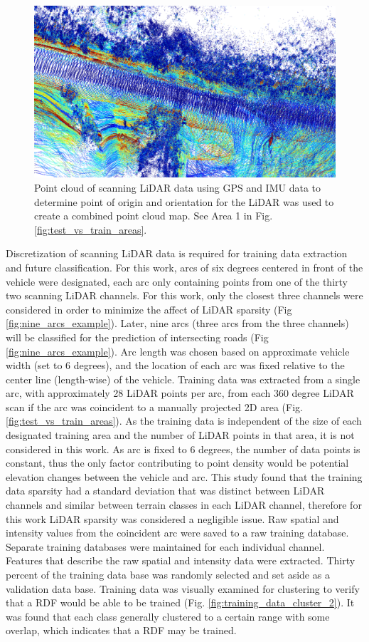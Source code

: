 \documentclass[journal,onecolumn]{IEEEtran}
\begin{document}
			\begin{figure}[H]
				\centering
				\includegraphics[width=0.75\linewidth]{figures/combined_pcd_example}
				\caption[Aggregated Point Cloud Data]{Point cloud of scanning LiDAR data using GPS and IMU data to determine point of origin and orientation for the LiDAR was used to create a combined point cloud map. See Area 1 in Fig. \ref{fig:test_vs_train_areas}.}
				\label{fig:pc_example}
			\end{figure}

			{Discretization of scanning LiDAR data is required for training data extraction and future classification. For this work, arcs of six degrees centered in front of the vehicle were designated, each arc only containing points from one of the thirty two scanning LiDAR channels. For this work, only the closest three channels were considered in order to minimize the affect of LiDAR sparsity (Fig \ref{fig:nine_arcs_example}). Later, nine arcs (three arcs from the three channels) will be classified for the prediction of intersecting roads (Fig \ref{fig:nine_arcs_example}). Arc length was chosen based on approximate vehicle width (set to 6 degrees), and the location of each arc was fixed relative to the center line (length-wise) of the vehicle. Training data was extracted from a single arc, with approximately 28 LiDAR points per arc, from each 360 degree LiDAR scan if the arc was coincident to a manually projected 2D area (Fig. \ref{fig:test_vs_train_areas}). As the training data is independent of the size of each designated training area and the number of LiDAR points in that area, it is not considered in this work. As arc is fixed to 6 degrees, the number of data points is constant, thus the only factor contributing to point density would be potential elevation changes between the vehicle and arc. This study found that the training data sparsity had a standard deviation that was distinct between LiDAR channels and similar between terrain classes in each LiDAR channel, therefore for this work LiDAR sparsity was considered a negligible issue. Raw spatial and intensity values from the coincident arc were saved to a raw training database. Separate training databases were maintained for each individual channel. Features that describe the raw spatial and intensity data were extracted. Thirty percent of the training data base was randomly selected and set aside as a validation data base. Training data was visually examined for clustering to verify that a RDF would be able to be trained (Fig. \ref{fig:training_data_cluster_2}). It was found that each class generally clustered to a certain range with some overlap, which indicates that a RDF may be trained. }
\end{document}
